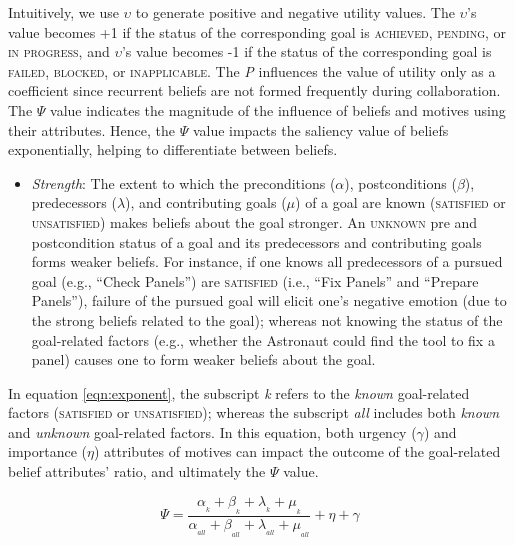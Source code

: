 \documentclass[12pt]{report}
\begin{document}
Intuitively, we use $\upsilon$ to generate positive and negative utility values.
The $\upsilon$'s value becomes +1 if the status of the corresponding goal is
\textsc{achieved}, \textsc{pending}, or \textsc{in progress}, and $\upsilon$'s
value becomes -1 if the status of the corresponding goal is \textsc{failed,
blocked}, or \textsc{inapplicable}. The \textit{P} influences the value of
utility only as a coefficient since recurrent beliefs are not formed frequently
during collaboration. The $\Psi$ value indicates the magnitude of the influence
of beliefs and motives using their attributes. Hence, the $\Psi$ value impacts
the saliency value of beliefs exponentially, helping to differentiate between
beliefs.

\begin{itemize}
  \setlength\itemsep{1mm}
  \item \textit{Strength}: The extent to which the preconditions ($\alpha$),
  postconditions ($\beta$), predecessors ($\lambda$), and contributing goals
  ($\mu$) of a goal are known (\textsc{satisfied} or \textsc{unsatisfied}) makes
  beliefs about the goal stronger. An \textsc{unknown} pre and postcondition
  status of a goal and its predecessors and contributing goals forms weaker
  beliefs. For instance, if one knows all predecessors of a pursued goal (e.g.,
  ``Check Panels'') are \textsc{satisfied} (i.e., ``Fix Panels'' and ``Prepare
  Panels''), failure of the pursued goal will elicit one's negative emotion (due
  to the strong beliefs related to the goal); whereas not knowing the status of
  the goal-related factors (e.g., whether the Astronaut could find the tool to
  fix a panel) causes one to form weaker beliefs about the goal.
\end{itemize}
In equation \ref{eqn:exponent}, the subscript \textit{k} refers to the
\textit{known} goal-related factors (\textsc{satisfied} or
\textsc{unsatisfied}); whereas the subscript \textit{all} includes both
\textit{known} and \textit{unknown} goal-related factors. In this equation, both
urgency ($\gamma$) and importance ($\eta$) attributes of motives can impact the
outcome of the goal-related belief attributes' ratio, and ultimately the $\Psi$
value.

\begin{equation}
    \Psi = \frac{\alpha_{_k} + \beta_{_k} + \lambda_{_k} +
    \mu_{_k}}{\alpha_{_{all}} + \beta_{_{all}} + \lambda_{_{all}} +
    \mu_{_{all}}} + \eta + \gamma
    \label{eqn:exponent}
\end{equation}
\end{document}
